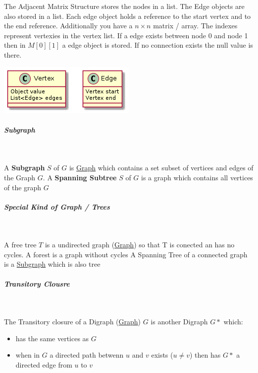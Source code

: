 \documentclass[11pt,twoside,twocolumn,landscape]{article}
\begin{document}
The Adjacent Matrix Structure stores the nodes in a list.
The Edge objects are also stored in a list.
Each edge object holds a reference to the start vertex and to the end reference.
Additionally you have a \(n \times n\) matrix / array.
The indexes represent vertexies in the vertex list.
If a edge exists between node 0 and node 1 then in \(M[0][1]\) a edge object is stored.
If no connection exists the null value is there. 



\begin{center}
\includegraphics[width=.9\linewidth]{img/adjacent_matrix_structure.png}
\end{center}

\subparagraph{Subgraph} \
\label{sec:org94c047c}

A \textbf{Subgraph} \(S\) of \(G\) is \href{../../../roam/20220201163000-graph.org}{Graph} which contains a set subset of vertices and edges of the Graph \(G\).
A \textbf{Spanning Subtree} \(S\) of \(G\) is a graph which contains all vertices of the graph \(G\)

\subparagraph{Special Kind of Graph / Trees} \
\label{sec:org023ff15}

A free tree \(T\) is a undirected graph (\href{../../../roam/20220201163000-graph.org}{Graph}) so that T is conected an has no cycles.
A forest is a graph without cycles
A Spanning Tree of a connected graph is a \href{../../../roam/20220201181419-subgraph.org}{Subgraph} which is also tree

\subparagraph{Transitory Clousre} \
\label{sec:org3720884}

The Transitory closure of a Digraph (\href{../../../roam/20220201163000-graph.org}{Graph}) \(G\) is another Digraph \(G*\) which:
\begin{itemize}
\item has the same vertices as \(G\)
\item when in \(G\) a directed path betwenn \(u\) and \(v\) exists (\(u \ne v\)) then has \(G*\) a directed edge from \(u\) to \(v\)
\end{itemize}
\end{document}
